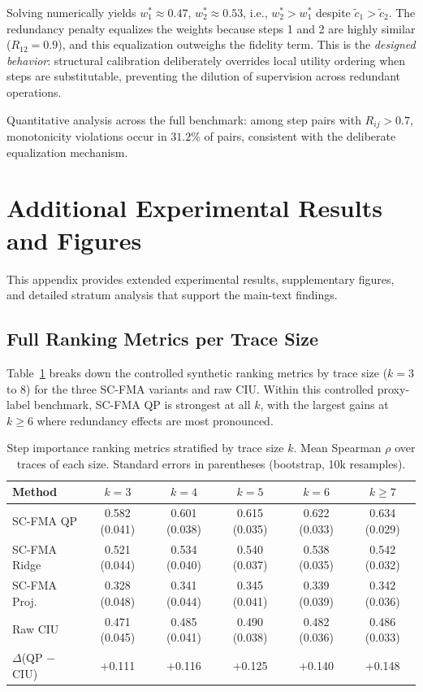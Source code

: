 \documentclass[a4paper,fleqn]{cas-sc}
\begin{document}
Solving numerically yields $w_1^* \approx 0.47$, $w_2^* \approx 0.53$, i.e., $w_2^* > w_1^*$ despite $\tilde{c}_1 > \tilde{c}_2$. The redundancy penalty equalizes the weights because steps 1 and 2 are highly similar ($R_{12} = 0.9$), and this equalization outweighs the fidelity term. This is the \emph{designed behavior}: structural calibration deliberately overrides local utility ordering when steps are substitutable, preventing the dilution of supervision across redundant operations.

Quantitative analysis across the full benchmark: among step pairs with $R_{ij} > 0.7$, monotonicity violations occur in $31.2\%$ of pairs, consistent with the deliberate equalization mechanism.

\section{Additional Experimental Results and Figures}
\label{app:additional-figures}

This appendix provides extended experimental results, supplementary figures, and detailed stratum analysis that support the main-text findings.

\subsection{Full Ranking Metrics per Trace Size}
\label{app:per-size}

Table~\ref{tab:per-size} breaks down the controlled synthetic ranking metrics by trace size ($k = 3$ to $8$) for the three SC-FMA variants and raw CIU. Within this controlled proxy-label benchmark, SC-FMA QP is strongest at all $k$, with the largest gains at $k \ge 6$ where redundancy effects are most pronounced.

\begin{table}[ht]
\caption{Step importance ranking metrics stratified by trace size $k$. Mean Spearman $\rho$ over traces of each size. Standard errors in parentheses (bootstrap, 10k resamples).}
\label{tab:per-size}
\centering
\small
\begin{tabular}{lccccc}
\toprule
\textbf{Method} & $k=3$ & $k=4$ & $k=5$ & $k=6$ & $k \ge 7$ \\
\midrule
SC-FMA QP      & 0.582 (0.041) & 0.601 (0.038) & 0.615 (0.035) & 0.622 (0.033) & 0.634 (0.029) \\
SC-FMA Ridge   & 0.521 (0.044) & 0.534 (0.040) & 0.540 (0.037) & 0.538 (0.035) & 0.542 (0.032) \\
SC-FMA Proj.   & 0.328 (0.048) & 0.341 (0.044) & 0.345 (0.041) & 0.339 (0.039) & 0.342 (0.036) \\
Raw CIU        & 0.471 (0.045) & 0.485 (0.041) & 0.490 (0.038) & 0.482 (0.036) & 0.486 (0.033) \\
\midrule
$\Delta$(QP $-$ CIU) & +0.111 & +0.116 & +0.125 & +0.140 & +0.148 \\
\bottomrule
\end{tabular}
\end{table}
\end{document}
